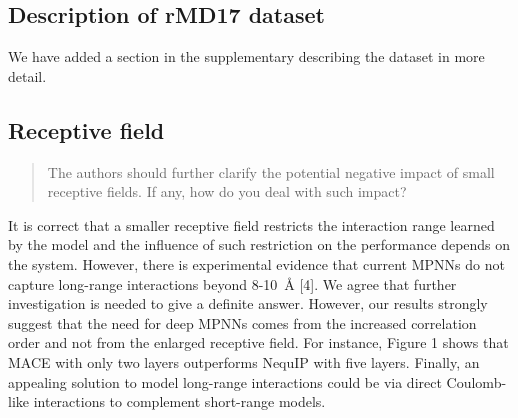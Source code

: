 \documentclass{article}
\begin{document}
\subsection*{Description of rMD17 dataset} 
We have added a section in the supplementary describing the dataset in more detail.

\subsection*{Receptive field}

\begin{quote}
The authors should further clarify the potential negative impact of small receptive fields. If any, how do you deal with such impact?
\end{quote}

It is correct that a smaller receptive field restricts the interaction range learned by the model 
and the influence of such restriction on the performance depends on the system.
However, there is experimental evidence that current MPNNs do not capture long-range interactions beyond 8-10~\AA{} [4]. 
We agree that further investigation is needed to give a definite answer.
However, our results strongly suggest that the need for deep MPNNs comes from the increased correlation order and not from the enlarged receptive field.
For instance, Figure 1 shows that MACE with only two layers outperforms NequIP with five layers.
Finally, an appealing solution to model long-range interactions could be via direct Coulomb-like interactions to complement short-range models. 
\end{document}
